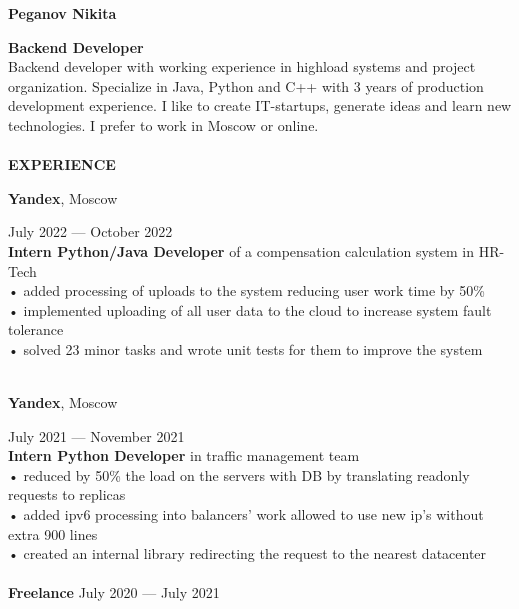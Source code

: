 \documentclass{article}
\begin{document}
\begin{vwcol}[widths={0.8,0.2},
 sep=.8cm, justify=flush,rule=0pt,indent=1em] 
\begin{spacing}{1.1}
\noindent\textbf{\Huge{Peganov Nikita}}\\
\end{spacing}
\noindent\textcolor[rgb]{0.1255,0.2902,0.7843}{\textbf{\Large{Backend Developer}}}\\
Backend developer with working experience in highload systems and project organization. Specialize in Java, Python and C++ with 3 years of production development experience. I like to create IT-startups, generate ideas and learn new technologies. I prefer to work in Moscow or online.\\
\\
\noindent\textcolor[rgb]{0.1255,0.2902,0.7843}{\textbf{\Large{EXPERIENCE}}}\\
\begin{Large}
\textbf{Yandex}, Moscow
\end{Large}
\hspace{200pt}July 2022 — October 2022\\
\textbf{Intern Python/Java Developer} of a compensation calculation system in HR-Tech\\
• added processing of uploads to the system reducing user work time by 50\%\\
• implemented uploading of all user data to the cloud to increase system fault tolerance\\
• solved 23 minor tasks and wrote unit tests for them to improve the system\\
\\
\begin{Large}
\textbf{Yandex}, Moscow
\end{Large}
\hspace{190pt}July 2021 — November 2021\\
\textbf{Intern Python Developer} in traffic management team\\
• reduced by 50\% the load on the servers with DB by translating readonly requests to replicas\\
• added ipv6 processing into balancers’ work allowed to use new ip’s without extra 900 lines\\
• created an internal library redirecting the request to the nearest datacenter\\
\\
\textbf{\Large{Freelance}}
\hspace{260pt}July 2020 — July 2021\\ 

\end{vwcol}
\end{document}
